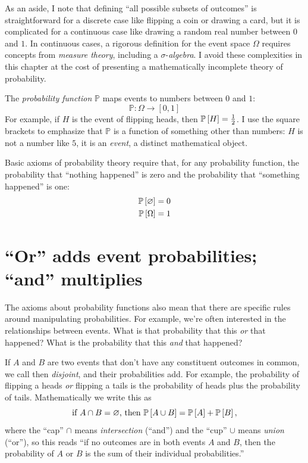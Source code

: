 As an aside, I note that defining ``all possible subsets of outcomes'' is
straightforward for a discrete case like flipping a coin or drawing a card, but
it is complicated for a continuous case like drawing a random real number
between $0$ and $1$. In continuous cases, a rigorous definition for the event
space $\Omega$ requires concepts from \emph{measure theory}, including a
$\sigma$-\emph{algebra}. I avoid these complexities in this chapter at the cost
of presenting a mathematically incomplete theory of probability.

The \emph{probability function} $\mathbb{P}$ maps events to numbers between $0$ and $1$:
\begin{equation*}
\mathbb{P} : \Omega \to [0, 1]
\end{equation*}
For example, if $H$ is the event of flipping heads, then $\mathbb{P}\left[{H}\right] =
\tfrac{1}{2}$. I use the square brackets to emphasize that $\mathbb{P}$ is a
function of something other than numbers: $H$ is not a number like $5$, it is
an \emph{event}, a distinct mathematical object.

Basic axioms of probability theory require that, for any probability function,
the probability that ``nothing happened'' is zero and the probability
that ``something happened'' is one:
\begin{align*}
\mathbb{P}\left[{\varnothing}\right] &= 0 \\
\mathbb{P}\left[{\Omega}\right] &= 1
\end{align*}

\section{``Or'' adds event probabilities; ``and'' multiplies}

The axioms about probability functions also mean that there are specific rules
around manipulating probabilities. For example, we're often interested in the
relationships between events. What is that probability that this \emph{or} that
happened? What is the probability that this \emph{and} that happened?

If $A$ and $B$ are two events that don't have any constituent outcomes in
common, we call then \emph{disjoint}, and their probabilities add. For example,
the probability of flipping a heads \emph{or} flipping a tails is the
probability of heads plus the probability of tails.  Mathematically we write
this as
$$
\text{if } A \cap B = \varnothing \text{, then } \mathbb{P}\left[{A \cup B}\right] = \mathbb{P}\left[{A}\right] + \mathbb{P}\left[{B}\right],
$$
where the ``cap'' $\cap$ means \emph{intersection} (``and'') and the ``cup'' $\cup$ means
\emph{union} (``or''), so this reads ``if no outcomes are in both events $A$ and $B$,
then the probability of $A$ or $B$ is the sum of their individual probabilities.''

